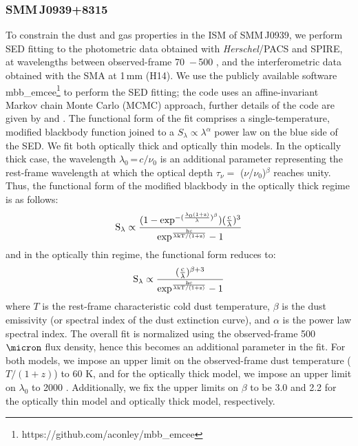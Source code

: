 \documentclass[twocolumn,apj,numberedappendix]{emulateapj}
\begin{document}
\subsubsection{SMM\,J0939+8315} \label{sec:SEDBg}
To constrain the dust and gas properties in the ISM of SMM\,J0939, we perform SED fitting to the
photometric data obtained with {\it Herschel}/PACS and SPIRE, at wavelengths
between observed-frame 70 \micron\,$-$\,500 \micron, and the interferometric data obtained with the SMA at 1\,mm (H14). We use the publicly
available software {\sc mbb\_emcee}\footnote{https://github.com/aconley/mbb\_emcee} to perform the SED fitting; the code uses an affine-invariant Markov chain Monte
Carlo (MCMC) approach, further details of the code are given by \citet{Riechers13a} and \citet{Dowell14a}. The
functional form of the fit comprises a single-temperature, modified blackbody function joined to a $S_{\lambda} \propto \lambda^\alpha
$ power law on the blue
side of the SED.
We fit both optically thick and optically thin models. In the optically thick case, the wavelength $
\lambda_0$\,=\,${c}/{\nu_0}$ is an additional parameter representing the rest-frame wavelength at which the optical
depth $\tau_{\nu} =$ ($\nu$/$\nu_0$)$^\beta$ reaches unity. Thus, the functional form of the modified blackbody
in the optically thick regime is as follows:
\begin{equation}
\rm S_{\lambda} \propto \frac{(1-exp^{-(\frac{\lambda_0 (1+z)}{\lambda})^{\beta}})(\frac{c}{\lambda})^3}
{exp^{\frac{hc}{\lambda\rm{kT/(1+z)} } }-1}
\end{equation}
and in the optically thin regime, the functional form reduces to:
\begin{equation}
\rm S_{\lambda} \propto \frac{(\frac{c}{\lambda})^{\beta+3}}{exp^{\frac{hc}{\lambda\rm{kT/(1+z)}}}-1}
\end{equation}
where $T$ is the rest-frame characteristic cold dust temperature, $\beta$ is the dust emissivity (or spectral index of the dust extinction
curve), and $\alpha$ is the power law spectral index. The overall fit is normalized using the observed-frame 500
$\micron$ flux density, hence this becomes an additional parameter in the fit. For both models, we impose an upper limit on the observed-frame dust temperature ($T/(1+z)$) to 60 K, and for the optically thick model, we impose an upper limit on $\lambda_0$ to 2000\,\,\micron. Additionally, we fix the upper limits on 
$\beta$ to be 3.0 and 2.2 for the optically thin model and optically thick model, respectively.
\end{document}
